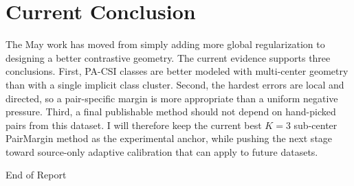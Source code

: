 \documentclass[11pt]{article}
\begin{document}
\section{Current Conclusion}

The May work has moved from simply adding more global regularization to designing a better contrastive geometry. The current evidence supports three conclusions. First, PA-CSI classes are better modeled with multi-center geometry than with a single implicit class cluster. Second, the hardest errors are local and directed, so a pair-specific margin is more appropriate than a uniform negative pressure. Third, a final publishable method should not depend on hand-picked pairs from this dataset. I will therefore keep the current best $K=3$ sub-center PairMargin method as the experimental anchor, while pushing the next stage toward source-only adaptive calibration that can apply to future datasets.

\vfill
\begin{center}
End of Report
\end{center}
\end{document}
